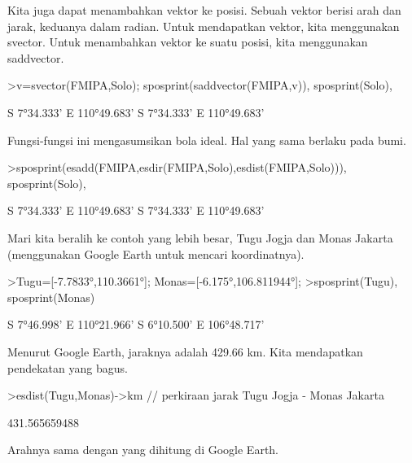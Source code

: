\documentclass{article}
\newenvironment{eulernotebook}{\par}{\par}
\newenvironment{eulercomment}{\par\medskip}{\par\medskip}
\begin{document}
\begin{eulernotebook}
\begin{eulercomment}
\begin{eulercomment}
\begin{eulercomment}
\begin{eulercomment}
\begin{eulercomment}
Kita juga dapat menambahkan vektor ke posisi. Sebuah vektor berisi
arah dan jarak, keduanya dalam radian. Untuk mendapatkan vektor, kita
menggunakan svector. Untuk menambahkan vektor ke suatu posisi, kita
menggunakan saddvector.
\end{eulercomment}
\begin{eulerprompt}
>v=svector(FMIPA,Solo); sposprint(saddvector(FMIPA,v)), sposprint(Solo),
\end{eulerprompt}
\begin{euleroutput}
  S 7°34.333' E 110°49.683'
  S 7°34.333' E 110°49.683'
\end{euleroutput}
\begin{eulercomment}
Fungsi-fungsi ini mengasumsikan bola ideal. Hal yang sama berlaku pada
bumi.
\end{eulercomment}
\begin{eulerprompt}
>sposprint(esadd(FMIPA,esdir(FMIPA,Solo),esdist(FMIPA,Solo))), sposprint(Solo),
\end{eulerprompt}
\begin{euleroutput}
  S 7°34.333' E 110°49.683'
  S 7°34.333' E 110°49.683'
\end{euleroutput}
\begin{eulercomment}
Mari kita beralih ke contoh yang lebih besar, Tugu Jogja dan Monas
Jakarta (menggunakan Google Earth untuk mencari koordinatnya).
\end{eulercomment}
\begin{eulerprompt}
>Tugu=[-7.7833°,110.3661°]; Monas=[-6.175°,106.811944°];
>sposprint(Tugu), sposprint(Monas)
\end{eulerprompt}
\begin{euleroutput}
  S 7°46.998' E 110°21.966'
  S 6°10.500' E 106°48.717'
\end{euleroutput}
\begin{eulercomment}
Menurut Google Earth, jaraknya adalah 429.66 km. Kita mendapatkan
pendekatan yang bagus.
\end{eulercomment}
\begin{eulerprompt}
>esdist(Tugu,Monas)->km // perkiraan jarak Tugu Jogja - Monas Jakarta
\end{eulerprompt}
\begin{euleroutput}
  431.565659488
\end{euleroutput}
\begin{eulercomment}
Arahnya sama dengan yang dihitung di Google Earth.
\end{eulercomment}
\begin{eulerprompt}

\end{eulerprompt}
\end{eulercomment}
\end{eulercomment}
\end{eulercomment}
\end{eulercomment}
\end{eulernotebook}
\end{document}
